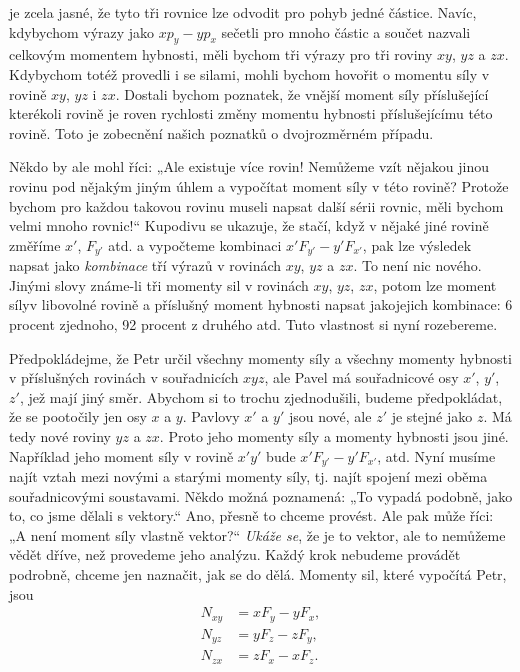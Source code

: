     je zcela jasné, že tyto tři rovnice lze odvodit pro pohyb jedné částice. Navíc, kdybychom výrazy
    jako \(xp_y - yp_x\) sečetli pro mnoho částic a součet nazvali celkovým momentem hybnosti, měli
    bychom tři výrazy pro tři roviny \(xy\), \(yz\) a \(zx\). Kdybychom totéž provedli i se silami,
    mohli bychom hovořit o momentu síly v rovině \(xy\), \(yz\) i \(zx\). Dostali bychom poznatek,
    že vnější moment síly příslušející kterékoli rovině je roven rychlosti změny momentu hybnosti
    příslušejícímu této rovině. Toto je zobecnění našich poznatků o dvojrozměrném případu.

    Někdo by ale mohl říci: „Ale existuje více rovin! Nemůžeme vzít nějakou jinou rovinu pod nějakým
    jiným úhlem a vypočítat moment síly v této rovině? Protože bychom pro každou takovou rovinu
    museli napsat další sérii rovnic, měli bychom velmi mnoho rovnic!“ Kupodivu se ukazuje, že
    stačí, když v nějaké jiné rovině změříme \(x'\), \(F_{y'}\) atd. a vypočteme kombinaci
    \(x'F_{y'}-y'F_{x'}\), pak lze výsledek napsat jako \emph{kombinace} tří výrazů v rovinách
    \(xy\), \(yz\) a \(zx\). To není nic nového. Jinými slovy známe-li tři momenty sil v rovinách
    \(xy\), \(yz\), \(zx\), potom lze moment sílyv libovolné rovině a příslušný moment hybnosti
    napsat jakojejich kombinace: 6 procent zjednoho, 92 procent z druhého atd. Tuto vlastnost si
    nyní rozebereme.

    Předpokládejme, že Petr určil všechny momenty síly a všechny momenty hybnosti v příslušných
    rovinách v souřadnicích \(xyz\), ale Pavel má souřadnicové osy \(x'\), \(y'\), \(z'\), jež mají
    jiný směr. Abychom si to trochu zjednodušili, budeme předpokládat, že se pootočily jen osy \(x\)
    a \(y\). Pavlovy \(x'\) a \(y'\) jsou nové, ale \(z'\) je stejné jako \(z\). Má tedy nové roviny
    \(yz\) a \(zx\). Proto jeho momenty síly a momenty hybnosti jsou jiné. Například jeho moment
    síly v rovině \(x'y'\) bude \(x'F_{y'}-y'F_{x'}\), atd. Nyní musíme najít vztah mezi novými a
    starými momenty síly, tj. najít spojení mezi oběma souřadnicovými soustavami. Někdo možná
    poznamená: „To vypadá podobně, jako to, co jsme dělali s vektory.“ Ano, přesně to chceme
    provést. Ale pak může říci: „A není moment síly vlastně vektor?“ \emph{Ukáže se}, že je to
    vektor, ale to nemůžeme vědět dříve, než provedeme jeho analýzu. Každý krok nebudeme provádět
    podrobně, chceme jen naznačit, jak se do dělá. Momenty sil, které vypočítá Petr, jsou
    \begin{subequations}\label{fyz:eq710}
      \begin{align}
        N_{xy} &=  xF_y - yF_x, \label{fyz:eq710a}  \\
        N_{yz} &=  yF_z - zF_y, \label{fyz:eq710b}  \\
        N_{zx} &=  zF_x - xF_z. \label{fyz:eq710c}        
      \end{align}
    \end{subequations}

